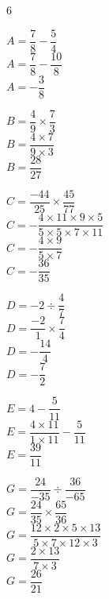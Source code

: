 \documentclass[a4paper]{book}
\begin{document}
{\begin{exerciceNote}{6}
        \begin{minipage}{0.24\linewidth}
            $A = \dfrac{7}{8} - \dfrac{5}{4}$\\[2ex]
            $A=\dfrac{7}{8}-\dfrac{10}{8}$\\[2ex]
            $A=-\dfrac{3}{8}$
        \end{minipage}
        \hfill\vline\hfill
        \begin{minipage}{0.24\linewidth}
            $B = \dfrac{4}{9}\times\dfrac{7}{3}$\\[2ex]
            $B = \dfrac{4\times7}{9\times3}$\\[2ex]
            $B = \dfrac{28}{27}$
        \end{minipage}        
        \hfill\vline\hfill
        \begin{minipage}{0.24\linewidth}
            $C = \dfrac{-44}{25} \times \dfrac{45}{77}$\\[2ex]
            $C = -\dfrac{4\times11\times9\times5}{5\times5\times7\times11}$\\[2ex]
            $C = -\dfrac{4\times9}{5\times7}$\\[2ex]
            $C = - \dfrac{36}{35}$
        \end{minipage}
        \hfill\vline\hfill
        \begin{minipage}{0.24\linewidth}
            $D = -2 \div \dfrac{4}{7}$\\[2ex]
            $D=\dfrac{-2}{1}\times\dfrac{7}{4}$\\[2ex]
            $D=-\dfrac{14}{4}$\\[2ex]
            $D=-\dfrac{7}{2}$
        \end{minipage}

        \vspace{1cm}

        \begin{minipage}{0.45\linewidth}
            $E = 4 - \dfrac{5}{11}$\\[2ex]
            $E = \dfrac{4\times11}{1\times11} - \dfrac{5}{11}$\\[2ex]
            $E=\dfrac{39}{11}$
        \end{minipage}
        \hfill\vline\hfill
        \begin{minipage}{0.45\linewidth}
            $G = \dfrac{24}{-35}\div\dfrac{36}{-65}$\\[2ex]
            $G = \dfrac{24}{35}\times\dfrac{65}{36}$\\[2ex]
            $G = \dfrac{12\times2\times5\times13}{5\times7\times12\times3}$\\[2ex]
            $G = \dfrac{2\times13}{7\times3}$\\[2ex]
            $G = \dfrac{26}{21}$
        \end{minipage}        
    \end{exerciceNote}

}
\end{document}
